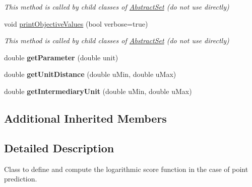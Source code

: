 \begin{DoxyCompactItemize}
\begin{DoxyCompactList}\small\item\em This method is called by child classes of \hyperlink{classAbstractSet}{Abstract\-Set} (do not use directly) \end{DoxyCompactList}\item 
\hypertarget{classLogarithmicScore_add0be2f6175a2aa0ef5e20026f9eb2be}{void \hyperlink{classLogarithmicScore_add0be2f6175a2aa0ef5e20026f9eb2be}{print\-Objective\-Values} (bool verbose=true)}\label{classLogarithmicScore_add0be2f6175a2aa0ef5e20026f9eb2be}

\begin{DoxyCompactList}\small\item\em This method is called by child classes of \hyperlink{classAbstractSet}{Abstract\-Set} (do not use directly) \end{DoxyCompactList}\item 
\hypertarget{classLogarithmicScore_a33390a7d2b8a14ef7f2e6300a22a4c0b}{double {\bfseries get\-Parameter} (double unit)}\label{classLogarithmicScore_a33390a7d2b8a14ef7f2e6300a22a4c0b}

\item 
\hypertarget{classLogarithmicScore_a123c27f97bfa6071da1f51f39b897bcb}{double {\bfseries get\-Unit\-Distance} (double u\-Min, double u\-Max)}\label{classLogarithmicScore_a123c27f97bfa6071da1f51f39b897bcb}

\item 
\hypertarget{classLogarithmicScore_a40576f47008aa6ab69d95535c0a5fa79}{double {\bfseries get\-Intermediary\-Unit} (double u\-Min, double u\-Max)}\label{classLogarithmicScore_a40576f47008aa6ab69d95535c0a5fa79}

\end{DoxyCompactItemize}
\subsection*{Additional Inherited Members}


\subsection{Detailed Description}
Class to define and compute the logarithmic score function in the case of point prediction. 

